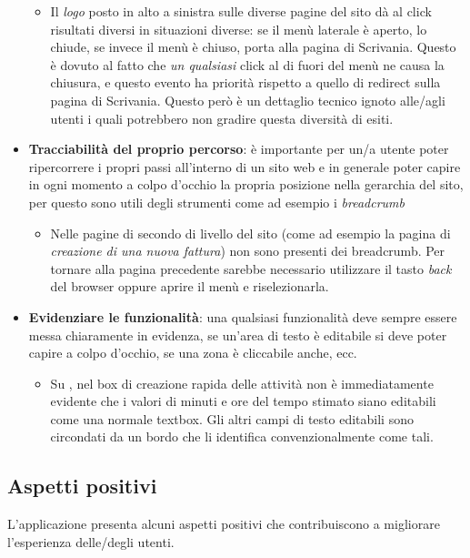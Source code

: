 \begin{itemize}
\begin{itemize}
	\item Il \textit{logo} posto in alto a sinistra sulle diverse pagine del sito dà al click
	risultati diversi in situazioni diverse: se il menù laterale è aperto, lo chiude, se invece
	il menù è chiuso, porta alla pagina di Scrivania. Questo è dovuto al fatto che
	\textit{un qualsiasi} click al di fuori del menù ne causa la chiusura, e questo evento ha
	priorità rispetto a quello di redirect sulla pagina di Scrivania. Questo però è un dettaglio
	tecnico ignoto alle/agli utenti i quali potrebbero non gradire questa diversità di esiti.
	\end{itemize}
\item \textbf{Tracciabilità del proprio percorso}: è importante per un/a utente poter
ripercorrere i propri passi all'interno di un sito web e in generale poter capire in ogni
momento a colpo d'occhio la propria posizione nella gerarchia del sito, per questo sono
utili degli strumenti come ad esempio i \textit{breadcrumb}
	\begin{itemize}
	\item Nelle pagine di secondo di livello del sito (come ad esempio la pagina di
	\textit{creazione di una nuova fattura}) non sono presenti dei breadcrumb. Per tornare alla
	pagina precedente sarebbe necessario utilizzare il tasto \textit{back} del browser oppure
	aprire il menù e riselezionarla.
	\end{itemize}
\item \textbf{Evidenziare le funzionalità}: una qualsiasi funzionalità deve sempre essere
messa chiaramente in evidenza, se un'area di testo è editabile si deve poter capire a colpo
d'occhio, se una zona è cliccabile anche, ecc.
	\begin{itemize}
	\item Su \textit{\resa{}}, nel box di creazione rapida delle attività non è immediatamente
	evidente che i valori di minuti e ore del tempo stimato siano editabili come una normale
	textbox. Gli altri campi di testo editabili sono circondati da un bordo che li identifica
	convenzionalmente come tali.
	\end{itemize}
\end{itemize}

\subsection{Aspetti positivi}
L'applicazione presenta alcuni aspetti positivi che contribuiscono a migliorare l'esperienza
delle/degli utenti.

